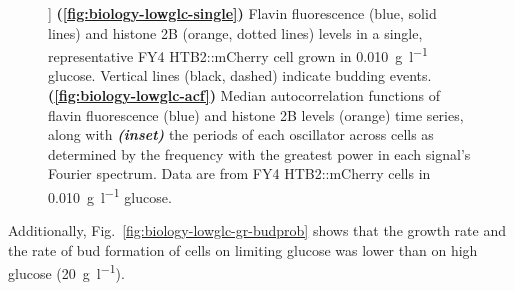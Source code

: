 \begin{figure}[b!]
  ]{
    \textbf{(\ref{fig:biology-lowglc-single})}
    Flavin fluorescence (blue, solid lines) and histone 2B (orange, dotted lines) levels in a single, representative FY4 HTB2::mCherry cell grown in \SI{0.010}{\gram~\litre^{-1}} glucose.
    Vertical lines (black, dashed) indicate budding events.
    \textbf{(\ref{fig:biology-lowglc-acf})}
    Median autocorrelation functions of flavin fluorescence (blue) and histone 2B levels (orange) time series, along with \textit{\textbf{(inset)}} the periods of each oscillator across cells as determined by the frequency with the greatest power in each signal's Fourier spectrum.
    Data are from FY4 HTB2::mCherry cells in \SI{0.010}{\gram~\litre^{-1}} glucose.
  }
  \label{fig:biology-lowglc}
\end{figure}

\pagebreak

Additionally, Fig.\ \ref{fig:biology-lowglc-gr-budprob} shows that the growth rate and the rate of bud formation of cells on limiting glucose was lower than on high glucose (\SI{20}{\gram~\litre^{-1}}).

